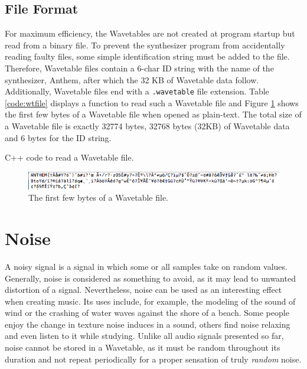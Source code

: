 \documentclass[12pt,twoside]{report}
\begin{document}
\subsection{File Format}

For maximum efficiency, the Wavetables are not created at program startup but read from a binary file. To prevent the synthesizer program from accidentally reading faulty files, some simple identification string must be added to the file. Therefore, Wavetable files contain a 6-char ID string with the name of the synthesizer, Anthem, after which the 32 KB of Wavetable data follow. Additionally, Wavetable files end with a \texttt{.wavetable} file extension. Table \ref{code:wtfile} displays a function to read such a Wavetable file and Figure \ref{fig:wtfile} shows the first few bytes of a Wavetable file when opened as plain-text. The total size of a Wavetable file is exactly 32774 bytes, 32768 bytes (32KB) of Wavetable data and 6 bytes for the ID string.

\begin{table}[t!]
  \caption{C++ code to read a Wavetable file. }
  \label{code:wtfile}
\end{table}

\begin{figure}[h!]
  \includegraphics[scale=0.7]{img/wtfile}
  \caption{The first few bytes of a Wavetable file.}
  \label{fig:wtfile}
\end{figure}

\section{Noise}

A noisy signal is a signal in which some or all samples take on random values. Generally, noise is considered as something to avoid, as it may lead to unwanted distortion of a signal. Nevertheless, noise can be used as an interesting effect when creating music. Its uses include, for example, the modeling of the sound of wind or the crashing of water waves against the shore of a beach. Some people enjoy the change in texture noise induces in a sound, others find noise relaxing and even listen to it while studying.  Unlike all audio signals\footnotemark{} presented so far, noise cannot\footnotemark{} be stored in a Wavetable, as it must be random throughout its duration and not repeat periodically for a proper sensation of truly \emph{random} noise.
\end{document}
